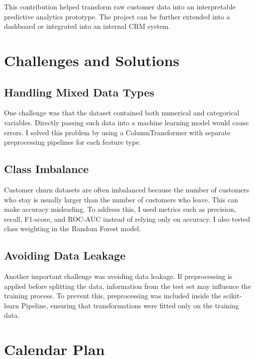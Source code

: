 \documentclass[12pt,a4paper]{article}
\begin{document}
This contribution helped transform raw customer data into an interpretable predictive analytics prototype. The project can be further extended into a dashboard or integrated into an internal CRM system.

\section{Challenges and Solutions}

\subsection{Handling Mixed Data Types}

One challenge was that the dataset contained both numerical and categorical variables. Directly passing such data into a machine learning model would cause errors. I solved this problem by using a ColumnTransformer with separate preprocessing pipelines for each feature type.

\subsection{Class Imbalance}

Customer churn datasets are often imbalanced because the number of customers who stay is usually larger than the number of customers who leave. This can make accuracy misleading. To address this, I used metrics such as precision, recall, F1-score, and ROC-AUC instead of relying only on accuracy. I also tested class weighting in the Random Forest model.

\subsection{Avoiding Data Leakage}

Another important challenge was avoiding data leakage. If preprocessing is applied before splitting the data, information from the test set may influence the training process. To prevent this, preprocessing was included inside the scikit-learn Pipeline, ensuring that transformations were fitted only on the training data.

\section{Calendar Plan}
\end{document}
